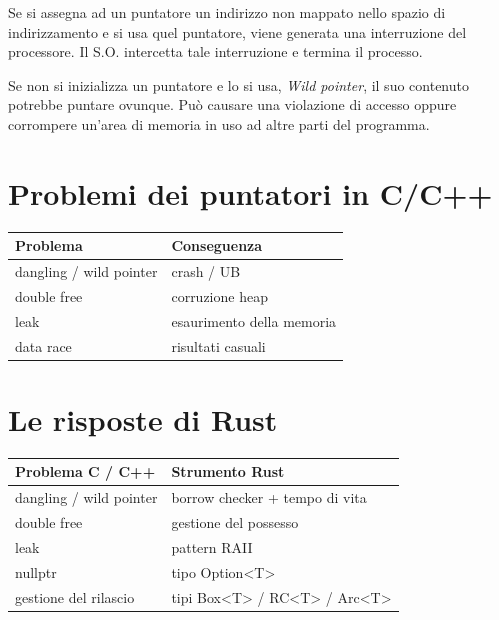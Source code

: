 Se si assegna ad un puntatore un indirizzo non mappato nello spazio di
indirizzamento e si usa quel puntatore, viene generata una interruzione del
processore. Il S.O. intercetta tale interruzione e termina il processo.


Se non si inizializza un puntatore e lo si usa, \textit{Wild pointer}, il suo contenuto potrebbe puntare
ovunque. Può causare una violazione di accesso oppure corrompere un'area di memoria in uso ad altre parti del programma.



\section{Problemi dei puntatori in C/C++  }

\begin{table}[H]
  \renewcommand{\arraystretch}{1.5}
  \centering
  \begin{tabular}{l p{5.5cm}}
    \hline
    \textbf{Problema}       & \textbf{Conseguenza}      \\
    \hline
    dangling / wild pointer & crash / UB                \\
    double free             & corruzione heap           \\
    leak                    & esaurimento della memoria \\
    data race               & risultati casuali         \\

    \hline
  \end{tabular}
\end{table}



\section{Le risposte di Rust  }

\begin{table}[H]
  \renewcommand{\arraystretch}{1.5}
  \centering
  \begin{tabular}{l p{5.5cm}}
    \hline
    \textbf{Problema C / C++} & \textbf{Strumento Rust}        \\
    \hline
    dangling / wild pointer   & borrow checker + tempo di vita \\
    double free               & gestione del possesso          \\
    leak                      & pattern RAII                   \\
    nullptr                   & tipo Option<T>                 \\
    gestione del rilascio     & tipi Box<T> / RC<T> / Arc<T>   \\

    \hline
  \end{tabular}
\end{table}


